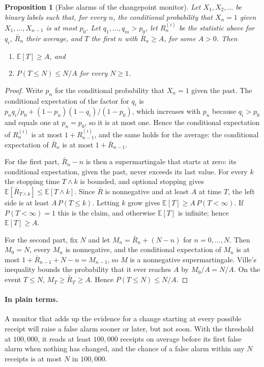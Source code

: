 \documentclass[11pt]{article}
\newcommand{\plain}{\paragraph{In plain terms.}}
\theoremstyle{definition}
\theoremstyle{plain}
\newtheorem{proposition}[definition]{Proposition}
\begin{document}
\begin{proposition}[False alarms of the changepoint monitor]\label{prop:sr}
Let $X_1,X_2,\ldots$ be binary labels such that, for every $n$, the conditional probability that
$X_n=1$ given $X_1,\ldots,X_{n-1}$ is at most $p_0$. Let $q_1,\ldots,q_m>p_0$, let $R^{(i)}_n$ be the
statistic above for $q_i$, $\bar R_n$ their average, and $T$ the first $n$ with $\bar R_n\ge A$,
for some $A>0$. Then
\begin{enumerate}
\item $\mathbb E[T]\ge A$, and
\item $P(T\le N)\le N/A$ for every $N\ge 1$.
\end{enumerate}
\end{proposition}

\begin{proof}
Write $p_n$ for the conditional probability that $X_n=1$ given the past. The conditional expectation
of the factor for $q_i$ is $p_nq_i/p_0+(1-p_n)(1-q_i)/(1-p_0)$, which increases with $p_n$ because
$q_i>p_0$ and equals one at $p_n=p_0$, so it is at most one. Hence the conditional expectation of
$R^{(i)}_n$ is at most $1+R^{(i)}_{n-1}$, and the same holds for the average: the conditional
expectation of $\bar R_n$ is at most $1+\bar R_{n-1}$.

For the first part, $\bar R_n-n$ is then a supermartingale that starts at zero: its conditional
expectation, given the past, never exceeds its last value. For every $k$ the stopping time
$T\wedge k$ is bounded, and optional stopping gives $\mathbb E[\bar R_{T\wedge k}]\le\mathbb
E[T\wedge k]$. Since $\bar R$ is nonnegative and at least $A$ at time $T$, the left side is at least
$A\,P(T\le k)$. Letting $k$ grow gives $\mathbb E[T]\ge A\,P(T<\infty)$. If $P(T<\infty)=1$ this
is the claim, and otherwise $\mathbb E[T]$ is infinite; hence $\mathbb E[T]\ge A$.

For the second part, fix $N$ and let $M_n=\bar R_n+(N-n)$ for $n=0,\ldots,N$. Then $M_0=N$, every
$M_n$ is nonnegative, and the conditional expectation of $M_n$ is at most $1+\bar R_{n-1}+N-n=
M_{n-1}$, so $M$ is a nonnegative supermartingale. Ville's inequality bounds the probability that
it ever reaches $A$ by $M_0/A=N/A$. On the event $T\le N$, $M_T\ge\bar R_T\ge A$. Hence $P(T\le
N)\le N/A$.
\end{proof}

\plain A monitor that adds up the evidence for a change starting at every possible receipt will
raise a false alarm sooner or later, but not soon. With the threshold at $100{,}000$, it reads at
least $100{,}000$ receipts on average before its first false alarm when nothing has changed, and the
chance of a false alarm within any $N$ receipts is at most $N$ in $100{,}000$.
\end{document}
